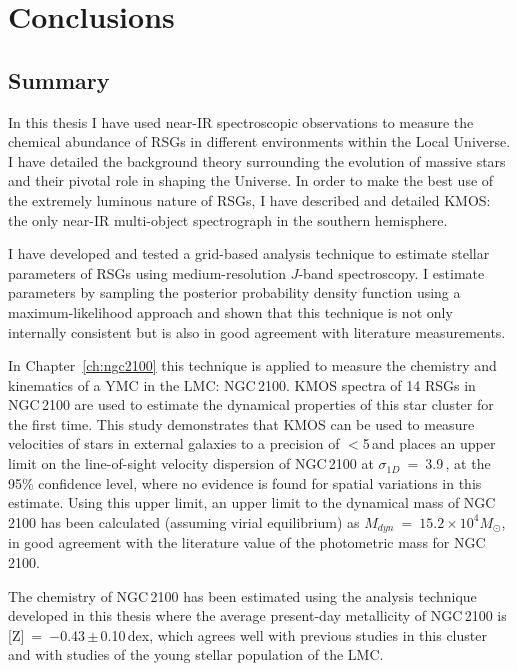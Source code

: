 \chapter{Conclusions}
\label{ch:conclusions}

\section{Summary} %
\label{sec:exec-sum}
In this thesis I have used near-IR spectroscopic observations to measure the chemical abundance of RSGs in different environments within the Local Universe.
I have detailed the background theory surrounding the evolution of massive stars and their pivotal role in shaping the Universe.
In order to make the best use of the extremely luminous nature of RSGs, I have described and detailed KMOS: the only near-IR multi-object spectrograph in the southern hemisphere.

I have developed and tested a grid-based analysis technique to estimate stellar parameters of RSGs using medium-resolution $J$-band spectroscopy.
I estimate parameters by sampling the posterior probability density function using a maximum-likelihood approach and shown that this technique is not only internally consistent but is also in good agreement with literature measurements.

In Chapter~\ref{ch:ngc2100} this technique is applied to measure the chemistry and kinematics of a YMC in the LMC: NGC\,2100.
KMOS spectra of 14 RSGs in NGC\,2100 are used to estimate the dynamical properties of this star cluster for the first time.
This study demonstrates that KMOS can be used to measure velocities of stars in external galaxies to a precision of $<$5\,\kms and places an upper limit on the line-of-sight velocity dispersion of NGC\,2100 at $\sigma_{1D}$~=~3.9\,\kms, at the 95\% confidence level, where no evidence is found for spatial variations in this estimate.
Using this upper limit, an upper limit to the dynamical mass of NGC\,2100 has been calculated (assuming virial equilibrium) as $M_{dyn}$~=~$15.2\times 10^{4}M_{\odot}$, in good agreement with the literature value of the photometric mass for NGC\,2100.

The chemistry of NGC\,2100 has been estimated using the analysis technique developed in this thesis where the average present-day metallicity of NGC\,2100 is [Z]~=~$-$0.43\,$\pm$\,0.10\,dex, which agrees well with previous studies in this cluster and with studies of the young stellar population of the LMC.

